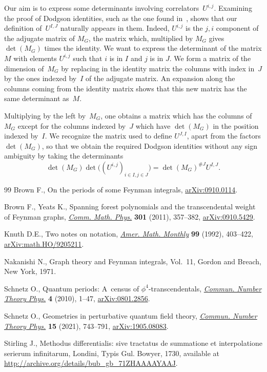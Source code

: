 \documentclass[11pt]{article}
\numberwithin{equation}{section}
\begin{document}
Our aim is to express some determinants involving correlators~$U^{i,j}$. Examining the proof of Dodgson
identities, such
as the one found in~\cite{Br2009}, shows that our definition of~$U^{I ,J}$ naturally appears in them. Indeed, $U^{i,j}$
is the $j,i$ component of the adjugate matrix of $M_G$, the matrix which, multiplied by $M_G$ gives $\det(M_G)$
times the identity. We want to express the determinant of the matrix $M$ with elements $U^{i,j}$ such that $i$ is in $I$ and $j$ is in
$J$. We form a matrix of the dimension of~$M_G$ by replacing in the identity matrix the columns with index in~$J$ by the
ones indexed by~$I$ of the adjugate matrix. An expansion along the columns coming from the identity matrix shows
that this new matrix has the same determinant as~$M$.

Multiplying by the left by~$M_G$, one obtains a matrix which has the columns of~$M_G$ except for the columns indexed
by~$J$ which have $\det(M_G)$ in the position indexed by~$I$. We recognize the matrix used to define $U^{J,I}$,
apart from the factors $\det(M_G)$, so that we obtain the required Dodgson identities without any sign ambiguity by
taking the determinants
\[
	\det(M_G) \det\bigl( (U^{i,j})_{i\in I,j\in J} \bigr) = \det(M_G)^{\# J} U^{I ,J}.
\]

\begin{thebibliography}{99}
Brown F., On the periods of some {F}eynman integrals, \href{https://arxiv.org/abs/0910.0114}{arXiv:0910.0114}.

Brown F., Yeats K., Spanning forest polynomials and the transcendental weight
 of {F}eynman graphs, \href{https://doi.org/10.1007/s00220-010-1145-1}{\textit{Comm. Math. Phys.}} \textbf{301} (2011),
 357--382, \href{https://arxiv.org/abs/0910.5429}{arXiv:0910.5429}.

Knuth D.E., Two notes on notation, \href{https://doi.org/10.2307/2325085}{\textit{Amer. Math. Monthly}} \textbf{99}
 (1992), 403--422, \href{https://arxiv.org/abs/math.HO/9205211}{arXiv:math.HO/9205211}.

Nakanishi N., Graph theory and {F}eynman integrals, Vol.~11, Gordon and Breach,
 New York, 1971.

Schnetz O., Quantum periods: {A}~census of {$\phi^4$}-transcendentals,
 \href{https://doi.org/10.4310/CNTP.2010.v4.n1.a1}{\textit{Commun. Number Theory Phys.}} \textbf{4} (2010), 1--47,
 \href{https://arxiv.org/abs/0801.2856}{arXiv:0801.2856}.

Schnetz O., Geometries in perturbative quantum field theory, \href{https://doi.org/10.4310/CNTP.2021.v15.n4.a2}{\textit{Commun.
 Number Theory Phys.}} \textbf{15} (2021), 743--791, \href{https://arxiv.org/abs/1905.08083}{arXiv:1905.08083}.

Stirling J., Methodus differentialis: sive tractatus de summatione et
 interpolatione serierum infinitarum, Londini, Typis Gul. Bowyer, 1730,
 available at \url{http://archive.org/details/bub_gb_71ZHAAAAYAAJ}.

\end{thebibliography}
\end{document}

